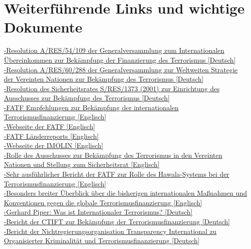 \documentclass[a4paper,11pt]{article}
\begin{document}
  \section{Weiterführende Links und wichtige Dokumente}
  
\href{http://www.un.org/Depts/german/uebereinkommen/ar54109.pdf}{-Resolution A/RES/54/109 der Generalversammlung zum Internationalen Übereinkommen zur Bekämpfung der Finanzierung des Terrorismus [Deutsch]} \\ \href{https://www.un.org/Depts/german/gv-60/band3/ar60288.pdf}{-Resolution A/RES/60/288 der Generalversammlung zur Weltweiten Strategie der Vereinten Nationen zur Bekämpfung des Terrorismus [Deutsch]} \\ \href{http://www.un.org/Depts/german/sr/sr_01-02/sr1373.pdf}{-Resolution des Sicherheitsrates S/RES/1373 (2001) zur Einrichtung des Ausschusses zur Bekämpfung des Terrorismus [Deutsch]} \\ \href{http://www.fatf-gafi.org/media/fatf/documents/recommendations/pdfs/FATF\%20Recommendations\%202012.pdf}{-FATF Empfehlungen zur Bekämpfung der internationalen Terrorismusfinanzierung [Englisch]} \\ \href{http://www.fatf-gafi.org/}{-Webseite der FATF [Englisch]} \\ \href{http://www.fatf-gafi.org/topics/mutualevaluations/}{-FATF Länderreports [Englisch]} \\ \href{https://www.imolin.org/}{-Webseite der IMOLIN [Englisch]} \\ \href{https://library.fes.de/pdf-files/iez/04876.pdf}{-Rolle des Ausschusses zur Bekämpfung des Terrorismus in den Vereinten Nationen und Stellung zum Sicherheitsrat [Englisch]} \\ \href{https://www.imolin.org/pdf/imolin/Role-of-hawala-and-similar-in-ml-tf-1.pdf}{-Sehr ausführlicher Bericht der FATF zur Rolle des Hawala-Systems bei der Terrorismusfinanzierung [Englisch]} \\ \href{https://www.imolin.org/pdf/overview_of_UN_conventions_2013.pdf}{-Besonders breiter Überblick über die bisherigen internationalen Maßnahmen und Konventionen gegen die globale Terrorismusfinanzierung [Englisch]} \\ \href{http://www.ag-friedensforschung.de/themen/Terrorismus/piper2.html}{-Gerhard Piper: Was ist Internationaler Terrorismus? [Deutsch]} \\ \href{http://www.un.org/depts/german/gs_sonst/09-64644_german_ctitf.pdf}{-Bericht der CTIFT zur Bekämpfung der Terrorismusfinanzierung [Deutsch]} \\ \href{https://www.transparency.de/fileadmin/Redaktion/Publikationen/2017/Scheinwerfer_76_III_2017_Organisierte_Kriminalitaet_und_Terrorismusfinanzierung.pdf}{-Bericht der Nichtregierungsorganisation Transparency International zu Organisierter Kriminalität und Terrorismusfinanzierung [Deutsch]}
 
\end{document}
